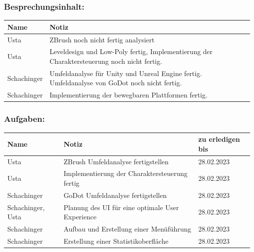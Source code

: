\subsubsection*{Besprechungsinhalt:}
\begin{tabular}{|m{}|m{}|}
\hline
Name & Notiz \\
\hline
Usta & ZBrush noch nicht fertig analysiert \\
\hline
Usta & Leveldesign und Low-Poly fertig, Implementierung der Charaktersteuerung noch nicht fertig. \\
\hline
Schachinger & Umfeldanalyse für Unity und Unreal Engine fertig. Umfeldanalyse von GoDot noch nicht fertig. \\
\hline
Schachinger & Implementierung der bewegbaren Plattformen fertig. \\
\hline
\end{tabular}

\subsubsection*{Aufgaben:}
\begin{tabular}{|m{}|m{}|m{}|}
\hline
Name & Notiz & zu erledigen bis \\
\hline
Usta & ZBrush Umfeldanalyse fertigstellen & 28.02.2023 \\
\hline
Usta & Implementierung der Charaktersteuerung fertig & 28.02.2023 \\
\hline
Schachinger & GoDot Umfeldanalyse fertigstellen & 28.02.2023 \\
\hline
Schachinger, Usta & Planung des UI für eine optimale User Experience & 28.02.2023 \\
\hline
Schachinger & Aufbau und Erstellung einer Menüführung & 28.02.2023 \\
\hline
Schachinger & Erstellung einer Statistikoberfläche & 28.02.2023 \\
\hline
\end{tabular}


\pagebreak

